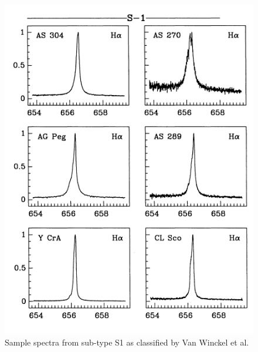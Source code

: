 \begin{figure}[!htb]
\centering
\includegraphics[scale=0.75]{figures/van winckel class.png}
\caption{Sample spectra from sub-type S1 as classified by Van Winckel et al.}
\end{figure}

